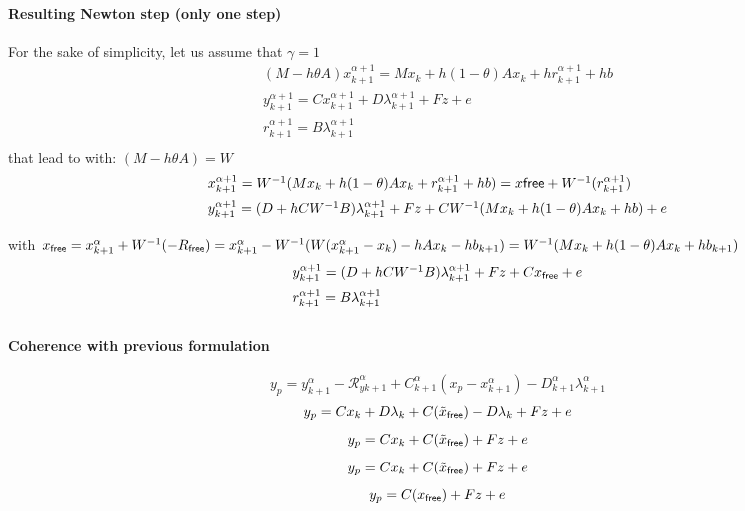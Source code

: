 \paragraph{Resulting Newton step (only one step)}
For the sake of simplicity, let us assume that $\gamma =1$
\begin{equation}
  \begin{array}{l}
     (M -h\theta A)x^{\alpha+1}_{k+1} = M x_{k} +h(1-\theta) A x_k + hr^{\alpha+1}_{k+1} + hb\\[2mm]
     y^{\alpha+1}_{k+1} =  C x^{\alpha+1}_{k+1} + D \lambda ^{\alpha+1}_{k+1} +Fz + e \\[2mm]
     r^{\alpha+1}_{k+1} = B \lambda ^{\alpha+1}_{k+1}\\[2mm]
  \end{array}
\end{equation}
that lead to with: $ (M -h\theta A) = W$
\begin{equation}
  \begin{array}{l}
     x^{\alpha+1}_{k+1} = W^{-1}(M x_{k} +h(1-\theta) A x_k + r^{\alpha+1}_{k+1} +hb) = x{\sf free} + W^{-1}(r^{\alpha+1}_{k+1})\\[2mm]
     y^{\alpha+1}_{k+1} =  ( D+hCW^{-1}B) \lambda ^{\alpha+1}_{k+1} +Fz + CW^{-1}(M
     x_k+h(1-\theta)Ax_k + hb) +e \\[2mm]
  \end{array}
\end{equation}
with $x_{{\sf free}} = x^{\alpha}_{k+1} + W^{-1}(-R_{{\sf free}})= x^{\alpha}_{k+1} - W^{-1}(W(x^{\alpha}_{k+1}
- x_k) -hAx_k-hb_{k+1} )= W^{-1}(Mx_k +h(1-\theta)Ax_k +h b_{k+1})$
\begin{equation}
  \begin{array}{l}
     y^{\alpha+1}_{k+1} =  ( D+hCW^{-1}B) \lambda ^{\alpha+1}_{k+1} +Fz + Cx_{{\sf free}}+e\\[2mm]
     r^{\alpha+1}_{k+1} = B \lambda ^{\alpha+1}_{k+1}\\[2mm]
  \end{array}
\end{equation}

\paragraph{Coherence with previous formulation}
\[y_p = y^{\alpha}_{k+1} -\mathcal R^{\alpha}_{yk+1} + C^{\alpha}_{k+1}(x_p -x^{\alpha}_{k+1}) -
D^{\alpha}_{k+1} \lambda^{\alpha}_{k+1} \]
\[y_p = Cx_k + D \lambda _k  + C(\tilde x_{{\sf free}}) -D \lambda_k +Fz + e\]
\[y_p = Cx_k   + C(\tilde x_{{\sf free}})  +Fz + e\]
\[y_p = Cx_k   + C(\tilde x_{{\sf free}})  +Fz + e\]
\[y_p = C(x_{{\sf free}})  +Fz + e\]

\clearpage


